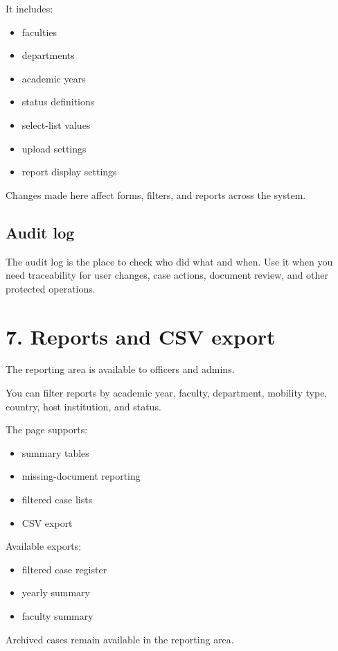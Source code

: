 \documentclass[11pt,a4paper]{article}
\begin{document}
It includes:

\begin{itemize}
  \item faculties
  \item departments
  \item academic years
  \item status definitions
  \item select-list values
  \item upload settings
  \item report display settings
\end{itemize}

Changes made here affect forms, filters, and reports across the system.

\subsection*{Audit log}
The audit log is the place to check who did what and when. Use it when you need traceability for user changes, case actions, document review, and other protected operations.

\section*{7. Reports and CSV export}
The reporting area is available to officers and admins.

You can filter reports by academic year, faculty, department, mobility type, country, host institution, and status.

The page supports:

\begin{itemize}
  \item summary tables
  \item missing-document reporting
  \item filtered case lists
  \item CSV export
\end{itemize}

Available exports:

\begin{itemize}
  \item filtered case register
  \item yearly summary
  \item faculty summary
\end{itemize}

Archived cases remain available in the reporting area.
\end{document}
